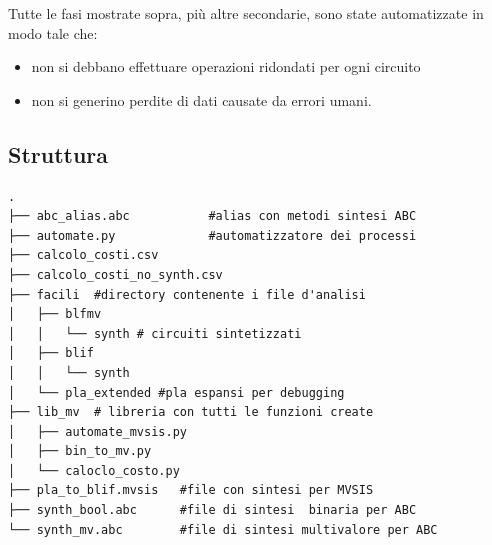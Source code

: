 \documentclass[
]{book}
\providecommand{\tightlist}{%
  \setlength{\itemsep}{0pt}\setlength{\parskip}{0pt}}
\begin{document}
Tutte le fasi mostrate sopra, più altre secondarie, sono state automatizzate in modo tale che:

\begin{itemize}
\tightlist
\item
  non si debbano effettuare operazioni ridondati per ogni circuito
\item
  non si generino perdite di dati causate da errori umani.
\end{itemize}

\hypertarget{struttura}{%
\subsection{Struttura}\label{struttura}}

\begin{verbatim}
.
├── abc_alias.abc           #alias con metodi sintesi ABC
├── automate.py             #automatizzatore dei processi
├── calcolo_costi.csv
├── calcolo_costi_no_synth.csv
├── facili  #directory contenente i file d'analisi
│   ├── blfmv
│   │   └── synth # circuiti sintetizzati
│   ├── blif
│   │   └── synth
│   └── pla_extended #pla espansi per debugging
├── lib_mv  # libreria con tutti le funzioni create
│   ├── automate_mvsis.py
│   ├── bin_to_mv.py
│   └── caloclo_costo.py
├── pla_to_blif.mvsis   #file con sintesi per MVSIS
├── synth_bool.abc      #file di sintesi  binaria per ABC
└── synth_mv.abc        #file di sintesi multivalore per ABC
\end{verbatim}

\newpage
\end{document}
